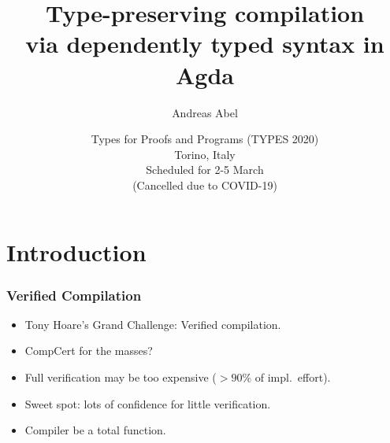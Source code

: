 \documentclass[t,fleqn,usenames,dvipsnames]{beamer}
\title[Dependently-Typed Compilation]{%
Type-preserving compilation \\ via dependently typed syntax in Agda}
\author[Abel]{
  Andreas Abel\inst{1}
}
\institute[] %
{
  \inst{1}
  Department of Computer Science and Engineering\\
  Chalmers and Gothenburg University, Sweden \\[1ex]
}
\date[TYPES 2020] %
{ Types for Proofs and Programs (TYPES 2020)\\
  Torino, Italy \\
  Scheduled for 2-5 March \\
  (Cancelled due to COVID-19)
}
\begin{document}
\maketitle






\section{Introduction}


\begin{frame}%
  \frametitle{Verified Compilation}
  \vspace{-3ex}
  \begin{itemize}
  \item Tony Hoare's Grand Challenge: Verified compilation.
  \item CompCert for the masses?
  \item Full verification may be too expensive ($> 90\%$ of impl.\ effort).
  \item Sweet spot: lots of confidence for little verification.
  \item Compiler be a \alert{total} function.
  \end{itemize}
\end{frame}

\end{document}
